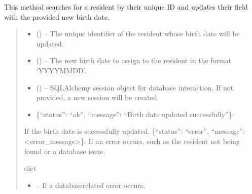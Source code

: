 \documentclass[letterpaper,10pt,english]{sphinxmanual}
\begin{document}
\begin{fulllineitems}
\begin{fulllineitems}
\sphinxAtStartPar
This method searches for a resident by their unique ID and updates their  field
with the provided new birth date.
\begin{quote}\begin{description}
\begin{itemize}
\item {} 
\sphinxAtStartPar
{} () – The unique identifier of the resident whose birth date will be updated.

\item {} 
\sphinxAtStartPar
{} () – The new birth date to assign to the resident in the format ‘YYYY\sphinxhyphen{}MM\sphinxhyphen{}DD’.

\item {} 
\sphinxAtStartPar
{} (\sphinxstyleliteralemphasis{\sphinxupquote{, }}) – SQLAlchemy session object for database interaction.
If not provided, a new session will be created.

\end{itemize}

\sphinxAtStartPar
\begin{description}
\begin{itemize}
\item {} 
\sphinxAtStartPar
\{“status”: “ok”, “message”: “Birth date updated successfully”\}:

\end{itemize}

\sphinxAtStartPar
If the birth date is successfully updated.
\sphinxhyphen{} \{“status”: “error”, “message”: <error\_message>\}:
If an error occurs, such as the resident not being found or a database issue.

\end{description}


\sphinxAtStartPar
dict

\begin{itemize}
\item {} 
\sphinxAtStartPar
{} – If a database\sphinxhyphen{}related error occurs.


\end{itemize}
\end{description}
\end{quote}
\end{fulllineitems}
\end{fulllineitems}
\end{document}
